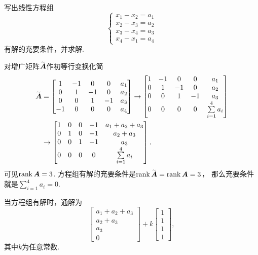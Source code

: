 \begin{example}
写出线性方程组\[
	\left\{ \begin{array}{l}
		x_1 - x_2 = a_1 \\
		x_2 - x_3 = a_2 \\
		x_3 - x_4 = a_3 \\
		x_4 - x_1 = a_4
	\end{array} \right.
\]有解的充要条件，并求解.
\begin{solution}
对增广矩阵\(\widetilde{\boldsymbol{A}}\)作初等行变换化简
\begin{align*}
	\widetilde{\boldsymbol{A}}
	&= \begin{bmatrix}
		1 & -1 & 0 & 0 & a_1 \\
		0 & 1 & -1 & 0 & a_2 \\
		0 & 0 & 1 & -1 & a_3 \\
		-1 & 0 & 0 & 0 & a_4
	\end{bmatrix} \to \begin{bmatrix}
		1 & -1 & 0 & 0 & a_1 \\
		0 & 1 & -1 & 0 & a_2 \\
		0 & 0 & 1 & -1 & a_3 \\
		0 & 0 & 0 & 0 & \sum\limits_{i=1}^4 a_i
	\end{bmatrix} \\
	&\to \begin{bmatrix}
		1 & 0 & 0 & -1 & a_1 + a_2 + a_3 \\
		0 & 1 & 0 & -1 & a_2 + a_3 \\
		0 & 0 & 1 & -1 & a_3 \\
		0 & 0 & 0 & 0 & \sum\limits_{i=1}^4 a_i
	\end{bmatrix}.
\end{align*}
可见\(\rank\boldsymbol{A} = 3\).
方程组有解的充要条件是\(\rank\widetilde{\boldsymbol{A}} = \rank\boldsymbol{A} = 3\)，
那么充要条件就是\(\sum\limits_{i=1}^4 a_i = 0\).

当方程组有解时，通解为\[
	\begin{bmatrix}
		a_1 + a_2 + a_3 \\ a_2 + a_3 \\ a_3 \\ 0
	\end{bmatrix}
	+ k \begin{bmatrix}
		1 \\ 1 \\ 1 \\ 1
	\end{bmatrix},
\]
其中\(k\)为任意常数.
\end{solution}
\end{example}

